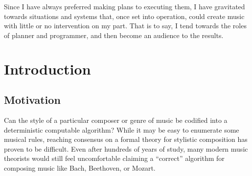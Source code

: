 

\begin{savequote}[75mm]
  Since I have always preferred making plans to executing them, I have
  gravitated towards situations and systems that, once set into operation,
  could create music with little or no intervention on my part. That is to say,
  I tend towards the roles of planner and programmer, and then become an
  audience to the results.
\end{savequote}

\chapter{Introduction}

\ifpdf
    \graphicspath{{Chapter1/Figs/Raster/}{Chapter1/Figs/PDF/}{Chapter1/Figs/}}
\else
    \graphicspath{{Chapter1/Figs/Vector/}{Chapter1/Figs/}}
\fi

\section{Motivation}

Can the style of a particular composer or genre of music be codified into a
deterministic computable algorithm? While it may be easy to enumerate some
musical rules, reaching consensus on a formal theory for
stylistic composition has proven to be difficult. Even after hundreds of years
of study, many modern music theorists would still feel uncomfortable claiming a
``correct'' algorithm for composing music like Bach, Beethoven, or Mozart.

